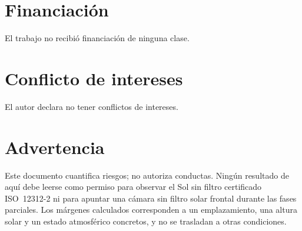 \documentclass[10pt,a4paper]{article}
\begin{document}
\section*{Financiación}

El trabajo no recibió financiación de ninguna clase.

\section*{Conflicto de intereses}

El autor declara no tener conflictos de intereses.

\section*{Advertencia}

Este documento cuantifica riesgos; no autoriza conductas. Ningún resultado de
aquí debe leerse como permiso para observar el Sol sin filtro certificado
ISO~12312-2 ni para apuntar una cámara sin filtro solar frontal durante las
fases parciales. Los márgenes calculados corresponden a un emplazamiento, una
altura solar y un estado atmosférico concretos, y no se trasladan a otras
condiciones.
\end{document}
